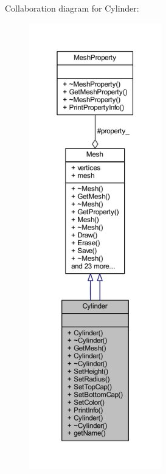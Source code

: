 Collaboration diagram for Cylinder\+:\nopagebreak
\begin{figure}[H]
\begin{center}
\leavevmode
\includegraphics[height=550pt]{class_cylinder__coll__graph}
\end{center}
\end{figure}
